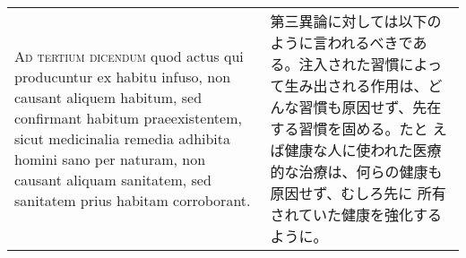 \documentclass[10pt]{jsarticle} %
\begin{document}
\begin{longtable}{p{21em}p{21em}}
\\



{\scshape Ad tertium dicendum} quod actus qui producuntur ex habitu
infuso, non causant aliquem habitum, sed confirmant habitum
praeexistentem, sicut medicinalia remedia adhibita homini sano per
naturam, non causant aliquam sanitatem, sed sanitatem prius habitam
corroborant.


&

第三異論に対しては以下のように言われるべきである。注入された習慣によっ
て生み出される作用は、どんな習慣も原因せず、先在する習慣を固める。たと
えば健康な人に使われた医療的な治療は、何らの健康も原因せず、むしろ先に
所有されていた健康を強化するように。



\end{longtable}
\end{document}
